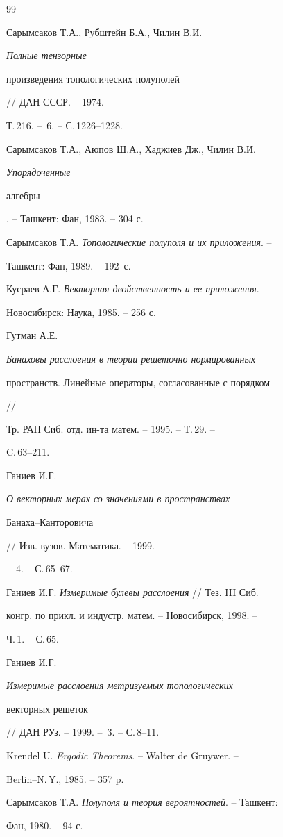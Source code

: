 \begin{thebibliography}{99} 


 




Сарымсаков Т.А., Рубштейн Б.А., Чилин В.И. {\em Полные тензорные 


произведения топологических полуполей} // ДАН СССР. -- 1974. -- 


Т.\,216. -- \No\,6. -- С.\,1226--1228. 




Сарымсаков Т.А., Аюпов Ш.А., Хаджиев Дж., Чилин В.И. {\em Упорядоченные 


алгебры}. -- Ташкент: Фан, 1983. -- 304 с. 




Сарымсаков Т.А. {\em Топологические полуполя и их приложения}. -- 


Ташкент: Фан, 1989. -- 192~с. 




Кусраев А.Г. {\em Векторная двойственность и ее приложения}. -- 


Новосибирск: Наука, 1985. -- 256 с. 




Гутман А.Е. {\em Банаховы расслоения в теории решеточно нормированных 


пространств. Линейные операторы, согласованные с порядком} // 


Тр. РАН Сиб. отд. ин-та матем. -- 1995. -- Т.\,29. -- 


C.\,63--211. 




Ганиев И.Г. {\em О векторных мерах со значениями в пространствах 


Банаха--Канторовича} // Изв. вузов. Математика. -- 1999. 


-- \No\,4. -- С.\,65--67. 




Ганиев И.Г. {\em Измеримые булевы расслоения} // Тез. III Сиб. 


конгр. по прикл. и индустр. матем. -- Новосибирск, 1998. -- 


Ч.\,1. -- С.\,65. 




Ганиев И.Г. {\em Измеримые расслоения метризуемых топологических 


векторных решеток} // ДАН РУз. -- 1999. -- \No\,3. -- С.\,8--11. 




Krendel U. {\em Ergodic Theorems}. -- Walter de Gruywer. -- 


Berlin--N.\,Y., 1985. -- 357 p. 




Сарымсаков Т.А. {\em Полуполя и теория вероятностей}. -- Ташкент: 


Фан, 1980. -- 94 с. 


 


\end{thebibliography} 


